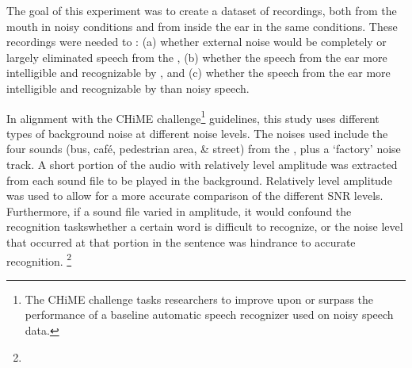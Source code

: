 The goal of this experiment was to create a dataset of recordings, both from the mouth \DIFdelbegin \DIFdel{, }\DIFdelend in noisy conditions \DIFdelbegin \DIFdel{, }\DIFdelend and from inside the ear in the same conditions.  These recordings were needed to \DIFdelbegin {}\DIFdelend \DIFaddbegin {}\DIFaddend : (a) whether \DIFdelbegin {}\DIFdelend external noise would be completely or largely eliminated \DIFdelbegin {}\DIFdelend \DIFaddbegin {}\DIFaddend speech from the \DIFdelbegin {}\DIFdelend \DIFaddbegin {}\DIFaddend , (b) whether the speech from the ear \DIFdelbegin {}\DIFdelend \DIFaddbegin {}\DIFaddend more intelligible and recognizable by \DIFdelbegin {}\DIFdelend \DIFaddbegin {}\DIFaddend , and (c) whether the speech from the ear \DIFdelbegin {}\DIFdelend \DIFaddbegin {}\DIFaddend more intelligible and recognizable by \DIFdelbegin {}\DIFdelend \DIFaddbegin {}\DIFaddend than noisy speech. 

In alignment with the CHiME challenge\footnote{The CHiME challenge tasks researchers to improve upon or surpass the performance of a baseline automatic speech recognizer used on noisy speech data.} guidelines, this study uses different types of background noise at different noise levels.  The noises used include the four sounds (bus, caf\'{e}, pedestrian area, \& street) from the \cite{chime:16}, plus a `factory' noise track.  A short portion of the audio with relatively level amplitude was extracted from each sound file to be played in the background.  Relatively level amplitude was used to allow for a more accurate comparison of the different SNR levels. Furthermore, if a sound file varied in amplitude, it would confound the recognition tasks\DIFdelbegin {}\DIFdelend \DIFaddbegin {}\DIFaddend whether a certain word \DIFaddbegin {}\DIFaddend is difficult to recognize, or the noise level that occurred at that portion in the sentence was \DIFdelbegin {}\DIFdelend \DIFaddbegin {}\DIFaddend hindrance to accurate recognition.
\DIFdelbegin \footnote{}
\addtocounter{footnote}{-1}%
\DIFdelend 

